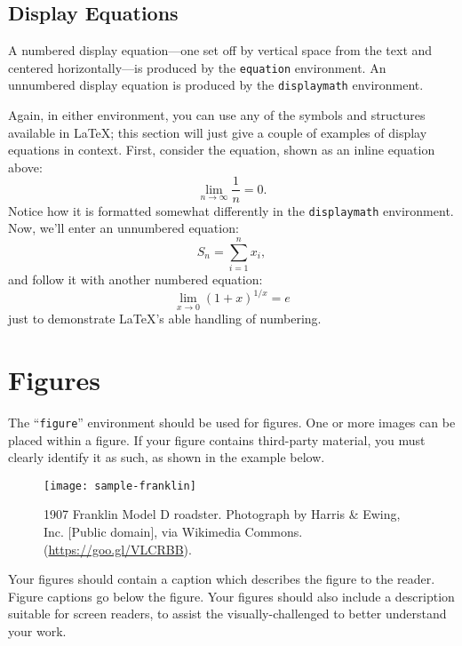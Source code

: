 \documentclass[
]{ceurart}
\begin{document}
\subsection{Display Equations}

A numbered display equation---one set off by vertical space from the
text and centered horizontally---is produced by the \verb|equation|
environment. An unnumbered display equation is produced by the
\verb|displaymath| environment.

Again, in either environment, you can use any of the symbols and
structures available in \LaTeX{}; this section will just give a couple
of examples of display equations in context.  First, consider the
equation, shown as an inline equation above:
\begin{equation}
  \lim_{n\rightarrow \infty} \frac{1}{n} = 0.
\end{equation}
Notice how it is formatted somewhat differently in
the \verb|displaymath|
environment.  Now, we'll enter an unnumbered equation:
\begin{displaymath}
  S_{n} = \sum_{i=1}^{n} x_{i} ,
\end{displaymath}
and follow it with another numbered equation:
\begin{equation}
  \lim_{x \to 0} (1 + x)^{1/x} = e
\end{equation}
just to demonstrate \LaTeX's able handling of numbering.

\section{Figures}

The ``\verb|figure|'' environment should be used for figures. One or
more images can be placed within a figure. If your figure contains
third-party material, you must clearly identify it as such, as shown
in the example below.
\begin{figure}
  \centering
  \texttt{[image: sample-franklin]}
  \caption{1907 Franklin Model D roadster. Photograph by Harris \&
    Ewing, Inc. [Public domain], via Wikimedia
    Commons. (\url{https://goo.gl/VLCRBB}).}
\end{figure}

Your figures should contain a caption which describes the figure to
the reader. Figure captions go below the figure. Your figures should
also include a description suitable for screen readers, to
assist the visually-challenged to better understand your work.
\end{document}

